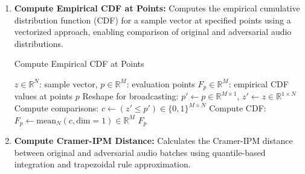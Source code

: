 \documentclass[../main.tex]{subfiles}
\begin{document}
\begin{enumerate}
    \item \textbf{Compute Empirical CDF at Points:} Computes the empirical cumulative distribution function (CDF) for a sample vector at specified points using a vectorized approach, enabling comparison of original and adversarial audio distributions.

    \begin{breakablealgorithm}{Compute Empirical CDF at Points}
    \begin{algorithmic}[1]
    \Require $z \in \mathbb{R}^N$: sample vector, $p \in \mathbb{R}^M$: evaluation points
    \Ensure $F_p \in \mathbb{R}^M$: empirical CDF values at points $p$
    \State Reshape for broadcasting: $p' \gets p \in \mathbb{R}^{M \times 1}$, $z' \gets z \in \mathbb{R}^{1 \times N}$ 
    \State Compute comparisons: $c \gets (z' \leq p') \in \{0, 1\}^{M \times N}$ 
    \State Compute CDF: $F_p \gets \text{mean}_N(c, \text{dim}=1) \in \mathbb{R}^M$ 
    \State \Return $F_p$ 
    \end{algorithmic}
    \end{breakablealgorithm}

    \item \textbf{Compute Cramer-IPM Distance:} Calculates the Cramer-IPM distance between original and adversarial audio batches using quantile-based integration and trapezoidal rule approximation.


\end{enumerate}
\end{document}

